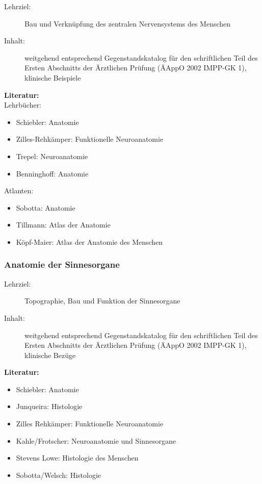 \documentclass[%
a4paper, %
11pt,               %
leqno,              %
fleqn,              %
]
{scrartcl}
\begin{document}
\begin{description}
  \item[Lehrziel:] Bau und Verknüpfung des zentralen Nervensystems des Menschen
  \item[Inhalt:] weitgehend entsprechend Gegenstandskatalog für den
    schriftlichen Teil des Ersten Abschnitts der Ärztlichen Prüfung (ÄAppO 2002
    IMPP-GK 1), klinische Beispiele
\end{description}
\textsf{\textbf{Literatur:}}\\
Lehrbücher:
\begin{itemize}\itemsep0pt
  \item Schiebler: Anatomie
  \item Zilles-Rehkämper: Funktionelle Neuroanatomie
  \item Trepel: Neuroanatomie
  \item Benninghoff: Anatomie
\end{itemize}
Atlanten:
\begin{itemize}\itemsep0pt
  \item Sobotta: Anatomie
  \item Tillmann: Atlas der Anatomie
  \item Köpf-Maier: Atlas der Anatomie des Menschen
\end{itemize}


\subsubsection{Anatomie der Sinnesorgane} %
\label{ssub:Anatomie der Sinnesorgane}

\begin{description}
  \item[Lehrziel:] Topographie, Bau und Funktion der Sinnesorgane
  \item[Inhalt:] weitgehend entsprechend Gegenstandskatalog für den
    schriftlichen Teil des Ersten Abschnitts der Ärztlichen Prüfung (ÄAppO 2002
    IMPP-GK 1), klinische Bezüge
\end{description}
\textsf{\textbf{Literatur:}}
\begin{itemize}\itemsep0pt
  \item Schiebler: Anatomie
  \item Junqueira: Histologie
  \item Zilles Rehkämper: Funktionelle Neuroanatomie
  \item Kahle/Frotscher: Neuroanatomie und Sinnesorgane
  \item Stevens Lowe: Histologie des Menschen
  \item Sobotta/Welsch: Histologie
\end{itemize}
\end{document}
